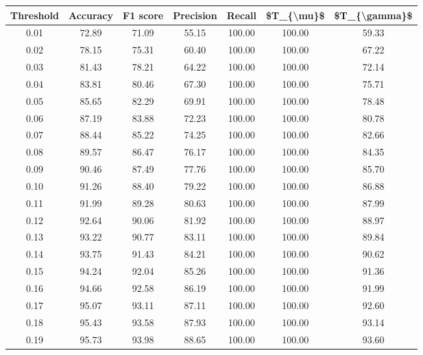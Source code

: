\begin{tabular}{|c|c|c|c|c|c|c|}
\hline
 Threshold &  Accuracy &  F1 score &  Precision &  Recall &  \$T\_\{\textbackslash mu\}\$ &  \$T\_\{\textbackslash gamma\}\$ \\
\hline
      0.01 &     72.89 &     71.09 &      55.15 &  100.00 &     100.00 &         59.33 \\
      0.02 &     78.15 &     75.31 &      60.40 &  100.00 &     100.00 &         67.22 \\
      0.03 &     81.43 &     78.21 &      64.22 &  100.00 &     100.00 &         72.14 \\
      0.04 &     83.81 &     80.46 &      67.30 &  100.00 &     100.00 &         75.71 \\
      0.05 &     85.65 &     82.29 &      69.91 &  100.00 &     100.00 &         78.48 \\
      0.06 &     87.19 &     83.88 &      72.23 &  100.00 &     100.00 &         80.78 \\
      0.07 &     88.44 &     85.22 &      74.25 &  100.00 &     100.00 &         82.66 \\
      0.08 &     89.57 &     86.47 &      76.17 &  100.00 &     100.00 &         84.35 \\
      0.09 &     90.46 &     87.49 &      77.76 &  100.00 &     100.00 &         85.70 \\
      0.10 &     91.26 &     88.40 &      79.22 &  100.00 &     100.00 &         86.88 \\
      0.11 &     91.99 &     89.28 &      80.63 &  100.00 &     100.00 &         87.99 \\
      0.12 &     92.64 &     90.06 &      81.92 &  100.00 &     100.00 &         88.97 \\
      0.13 &     93.22 &     90.77 &      83.11 &  100.00 &     100.00 &         89.84 \\
      0.14 &     93.75 &     91.43 &      84.21 &  100.00 &     100.00 &         90.62 \\
      0.15 &     94.24 &     92.04 &      85.26 &  100.00 &     100.00 &         91.36 \\
      0.16 &     94.66 &     92.58 &      86.19 &  100.00 &     100.00 &         91.99 \\
      0.17 &     95.07 &     93.11 &      87.11 &  100.00 &     100.00 &         92.60 \\
      0.18 &     95.43 &     93.58 &      87.93 &  100.00 &     100.00 &         93.14 \\
      0.19 &     95.73 &     93.98 &      88.65 &  100.00 &     100.00 &         93.60 \\

\end{tabular}
